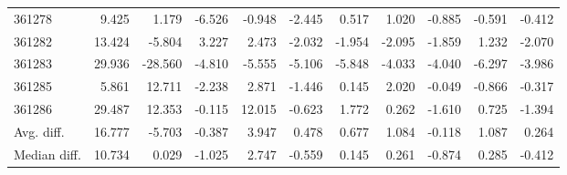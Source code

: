 \begin{tabular}{lrrrrrrrrrr}
361278 & 9.425 & 1.179 & -6.526 & -0.948 & -2.445 & 0.517 & 1.020 & -0.885 & -0.591 & -0.412 \\
361282 & 13.424 & -5.804 & 3.227 & 2.473 & -2.032 & -1.954 & -2.095 & -1.859 & 1.232 & -2.070 \\
361283 & 29.936 & -28.560 & -4.810 & -5.555 & -5.106 & -5.848 & -4.033 & -4.040 & -6.297 & -3.986 \\
361285 & 5.861 & 12.711 & -2.238 & 2.871 & -1.446 & 0.145 & 2.020 & -0.049 & -0.866 & -0.317 \\
361286 & 29.487 & 12.353 & -0.115 & 12.015 & -0.623 & 1.772 & 0.262 & -1.610 & 0.725 & -1.394 \\
Avg. diff. & 16.777 & -5.703 & -0.387 & 3.947 & 0.478 & 0.677 & 1.084 & -0.118 & 1.087 & 0.264 \\
Median diff. & 10.734 & 0.029 & -1.025 & 2.747 & -0.559 & 0.145 & 0.261 & -0.874 & 0.285 & -0.412 \\
\bottomrule
\end{tabular}
